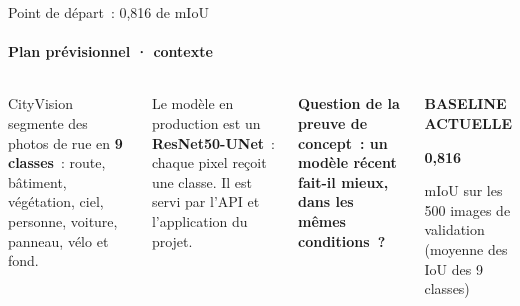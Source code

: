 \documentclass[aspectratio=169,9pt,xcolor=table,t]{beamer}
\newcommand{\kicker}[2][accent]{{\fontsize{6.5}{8}\selectfont\bfseries\color{#1}\MakeUppercase{#2}}}
\newcommand{\soft}[1]{{\color{bodyc}#1}}
\newcommand{\hugenum}[1]{{\fontsize{34}{36}\selectfont\bfseries #1}}
\begin{document}
\begin{frame}{Point de départ~: 0,816 de mIoU}
\framesubtitle{Plan prévisionnel · contexte}
\vspace{2mm}
\begin{columns}[c,onlytextwidth]
\soft{CityVision segmente des photos de rue en \textbf{\color{navy}9 classes}~: route, bâtiment, végétation, ciel, personne, voiture, panneau, vélo et fond.}\par\medskip
\soft{Le modèle en production est un \textbf{\color{navy}ResNet50-UNet}~: chaque pixel reçoit une classe. Il est servi par l'API et l'application du projet.}\par\bigskip
{\fontsize{12}{15}\selectfont\bfseries Question de la preuve de concept~: un modèle récent fait-il mieux, dans les mêmes conditions~?\par}
\begin{darkcard}[top=6mm,bottom=6mm,left=6mm]
\kicker[mint]{Baseline actuelle}\par\vspace{2mm}
\hugenum{0,816}\par\vspace{2mm}
{\color{paleblue}mIoU sur les 500 images de validation (moyenne des IoU des 9 classes)}
\end{darkcard}
\end{columns}
\end{frame}
\end{document}
